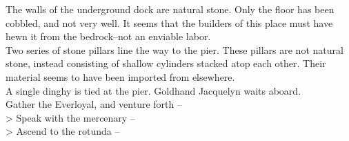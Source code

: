 The walls of the underground dock are natural stone. Only the floor has been cobbled, and not very well. It seems that the builders of this place must have hewn it from the bedrock--not an enviable labor.\\

Two series of stone pillars line the way to the pier. These pillars are not natural stone, instead consisting of shallow cylinders stacked atop each other. Their material seems to have been imported from elsewhere.\\

A single dinghy is tied at the pier. Goldhand Jacquelyn waits aboard.\\

 Gather the Everloyal, and venture forth -- \\
> Speak with the mercenary -- \\
> Ascend to the rotunda -- 